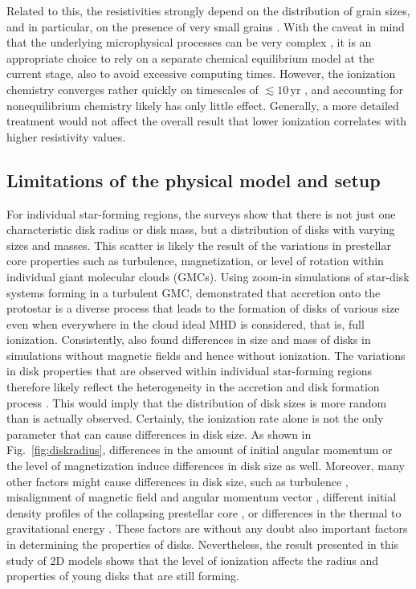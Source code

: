 \documentclass{aa}
\newcommand{\unit}[1]{\ensuremath{\, \mathrm{#1}}}
\newcommand{\Fig}[1]{Fig.~\ref{fig:#1}}    %
\begin{document}
Related to this, the resistivities strongly depend on the distribution of grain sizes, and in particular, on the presence of very small grains 
\citep[ VSGs;][]{Dapp2012,Dzyurkevich2017,Zhao2018}.  
With the caveat in mind that the underlying microphysical processes can be very complex \citep{Grassi2019}, it is an appropriate choice to rely on a separate chemical equilibrium model at the current stage, 
also to avoid excessive computing times. 
However, the ionization chemistry converges rather quickly on timescales of $\lesssim 10 \unit{yr}$ \citep{Caselli2002II}, and accounting for nonequilibrium chemistry likely has only little effect.
Generally, a more detailed treatment would not affect the overall result that lower ionization correlates with higher resistivity values. 

\subsection{Limitations of the physical model and setup}
For individual star-forming regions, 
the surveys show that there is not just one characteristic disk radius or disk mass, but a distribution of disks with varying sizes and masses. 
This scatter is likely the result of the variations in prestellar core properties such as turbulence, magnetization, or level of rotation within individual giant molecular clouds (GMCs).
Using zoom-in simulations of star-disk systems forming in a turbulent GMC, \citet{Kuffmeier2017} demonstrated that accretion onto the protostar is a diverse process that leads to the formation of disks of various size even when everywhere in the cloud ideal MHD is considered, that is, full ionization.
Consistently, \citet{Bate2018} also found differences in size and mass of disks in simulations without magnetic fields and hence without ionization. The variations in disk properties that are observed within individual star-forming regions therefore likely reflect the heterogeneity in the accretion and disk formation process \citep[see also][]{Kuffmeier2018,Kuffmeier2019}. 
This would imply that the distribution of disk sizes is more random than is actually observed.
Certainly, the ionization rate alone is not the only parameter that can cause differences in disk size. 
As shown in \Fig{diskradius}, differences in the amount of initial angular momentum or the level of magnetization induce differences in disk size as well. 
Moreover, many other factors might cause differences in disk size, such as turbulence \citep{Seifried2012,Seifried2013}, misalignment of magnetic field and angular momentum vector \citep{Joos2012,Krumholz2013}, different initial density profiles of the collapsing prestellar core \citep{Machida2014}, or differences in the thermal to gravitational energy \citep{Tsukamoto2018}.
These factors are without any doubt also important factors in determining the properties of disks. 
Nevertheless, the result presented in this study of 2D models shows that the level of ionization affects the radius and properties of young disks that are still forming. 
\end{document}
